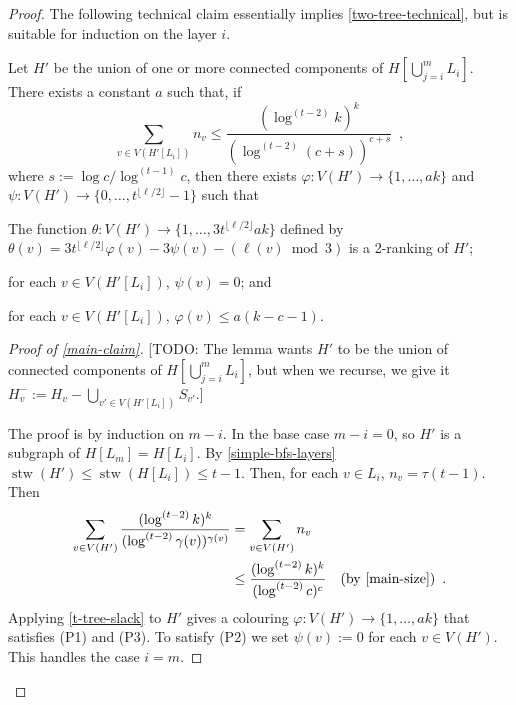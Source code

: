 \documentclass[kpfonts]{patmorin}
\DeclareMathOperator{\stw}{stw}
\newcommand{\ellt}{{\lfloor\ell/2\rfloor}}
\theoremstyle{named}
\begin{document}
\begin{proof}
    The following technical claim essentially implies \cref{two-tree-technical}, but is suitable for induction on the layer $i$.

    \begin{clm}\label{main-claim}
        Let $H'$ be the union of one or more connected components of $H[\bigcup_{j=i}^m L_i]$. There exists a constant $a$ such that, if
        \begin{equation}
            \sum_{v\in V(H'[L_i])} n_v\le \frac{(\log^{(t-2)} k)^{k}}{(\log^{(t-2)} (c+s))^{c+s}} \enspace , \label{main-size}
        \end{equation}
        where $s:=\log c/\log^{(t-1)} c$,
        then there exists $\varphi:V(H')\to\{1,\ldots,ak\}$ and $\psi:V(H')\to\{0,\ldots,t^{\ellt}-1\}$ such that
        \begin{compactenum}[(P1)]
            \item The function $\theta:V(H')\to\{1,\ldots,3t^{\ellt}ak\}$ defined by $\theta(v)=3t^{\ellt}\varphi(v) - 3\psi(v) -(\ell(v)\bmod 3)$ is a 2-ranking of $H'$;
            \item for each $v\in V(H'[L_i])$, $\psi(v)=0$; and
            \item for each $v\in V(H'[L_i])$, $\varphi(v)\le a(k-c-1)$.
        \end{compactenum}
    \end{clm}

    \begin{proof}[Proof of \cref{main-claim}]
        [TODO: The lemma wants $H'$ to be the union of connected components of $H[\bigcup_{j=i}^m L_i]$, but when we recurse, we give it $H^-_v:=H_v-\bigcup_{v'\in V(H'[L_i])} S_{v'}$.]


        The proof is by induction on $m-i$. In the base case $m-i=0$, so $H'$ is a subgraph of $H[L_m]=H[L_i]$. By \cref{simple-bfs-layers} $\stw(H')\le \stw(H[L_i])\le t-1$.  Then, for each $v\in L_i$, $n_v=\tau(t-1)$.  Then
        \begin{align*}
            \sum_{v\in V(H')} \frac{(\log^{(t-2)} k)^k}{(\log^{(t-2)} \gamma(v))^{\gamma(v)}}
            & = \sum_{v\in V(H')} n_v \\
            & \le \frac{(\log^{(t-2)} k)^{k}}{(\log^{(t-2)} c)^c} & \text{(by \cref{main-size})} \enspace .
        \end{align*}
        Applying \cref{t-tree-slack} to $H'$ gives a colouring $\varphi: V(H')\to\{1,\ldots,ak\}$ that satisfies (P1) and (P3).  To satisfy (P2) we set $\psi(v):=0$ for each $v\in V(H')$.  This handles the case $i=m$.


\end{proof}
\end{proof}
\end{document}
